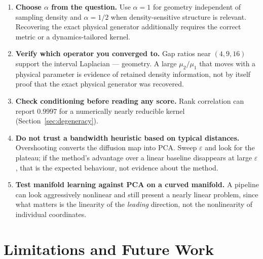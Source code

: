 \documentclass[11pt]{article}
\newcommand{\eps}{\varepsilon}
\begin{document}
\begin{enumerate}
\item \textbf{Choose $\alpha$ from the question.} Use $\alpha=1$ for geometry
independent of sampling density and $\alpha=1/2$ when density-sensitive structure
is relevant. Recovering the exact physical generator additionally requires the
correct metric or a dynamics-tailored kernel.

\item \textbf{Verify which operator you converged to.} Gap ratios near
$(4,9,16)$ support the interval Laplacian --- geometry. A large
$\mu_2/\mu_1$ that moves with a physical parameter is evidence of retained
density information, not by itself proof that the exact physical generator was
recovered.

\item \textbf{Check conditioning before reading any score.} Rank correlation can
report $0.9997$ for a numerically nearly reducible kernel
(Section~\ref{sec:degeneracy}).

\item \textbf{Do not trust a bandwidth heuristic based on typical distances.}
Overshooting converts the diffusion map into PCA. Sweep $\eps$ and look for the
plateau; if the method's advantage over a linear baseline disappears at large
$\eps$, that is the expected behaviour, not evidence about the method.

\item \textbf{Test manifold learning against PCA on a curved manifold.} A pipeline
can look aggressively nonlinear and still present a nearly linear problem, since
what matters is the linearity of the \emph{leading} direction, not the
nonlinearity of individual coordinates.
\end{enumerate}

\section{Limitations and Future Work}
\label{sec:limitations}
\end{document}
